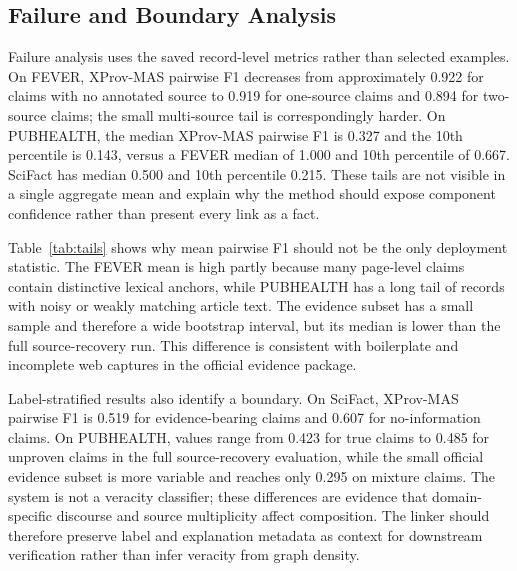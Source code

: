 \documentclass{ieeeaccess}
\begin{document}
\subsection{Failure and Boundary Analysis}
Failure analysis uses the saved record-level metrics rather than selected examples. On FEVER, XProv-MAS pairwise F1 decreases from approximately 0.922 for claims with no annotated source to 0.919 for one-source claims and 0.894 for two-source claims; the small multi-source tail is correspondingly harder. On PUBHEALTH, the median XProv-MAS pairwise F1 is 0.327 and the 10th percentile is 0.143, versus a FEVER median of 1.000 and 10th percentile of 0.667. SciFact has median 0.500 and 10th percentile 0.215. These tails are not visible in a single aggregate mean and explain why the method should expose component confidence rather than present every link as a fact.

\begin{table}[!ht]
\centering
\caption{Lower-tail and median behavior of XProv-MAS.}
\label{tab:tails}
\end{table}

Table~\ref{tab:tails} shows why mean pairwise F1 should not be the only deployment statistic. The FEVER mean is high partly because many page-level claims contain distinctive lexical anchors, while PUBHEALTH has a long tail of records with noisy or weakly matching article text. The evidence subset has a small sample and therefore a wide bootstrap interval, but its median is lower than the full source-recovery run. This difference is consistent with boilerplate and incomplete web captures in the official evidence package.

Label-stratified results also identify a boundary. On SciFact, XProv-MAS pairwise F1 is 0.519 for evidence-bearing claims and 0.607 for no-information claims. On PUBHEALTH, values range from 0.423 for true claims to 0.485 for unproven claims in the full source-recovery evaluation, while the small official evidence subset is more variable and reaches only 0.295 on mixture claims. The system is not a veracity classifier; these differences are evidence that domain-specific discourse and source multiplicity affect composition. The linker should therefore preserve label and explanation metadata as context for downstream verification rather than infer veracity from graph density.
\end{document}
